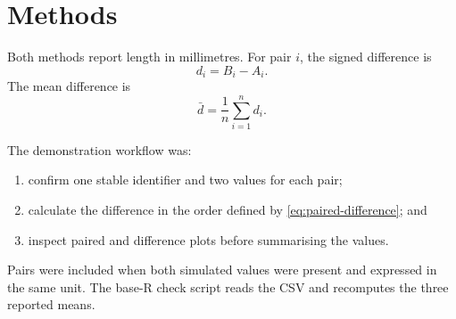 \section{Methods}
\label{sec:methods}

Both methods report length in millimetres. For pair $i$, the signed difference
is
\begin{equation}
  d_i=B_i-A_i.
  \label{eq:paired-difference}
\end{equation}
The mean difference is
\begin{equation}
  \bar d=\frac{1}{n}\sum_{i=1}^{n}d_i.
  \label{eq:mean-difference-running}
\end{equation}

The demonstration workflow was:
\begin{enumerate}
  \item confirm one stable identifier and two values for each pair;
  \item calculate the difference in the order defined by
        \cref{eq:paired-difference}; and
  \item inspect paired and difference plots before summarising the values.
\end{enumerate}
Pairs were included when both simulated values were present and expressed in
the same unit. The base-R check script reads the CSV and recomputes the three
reported means.
